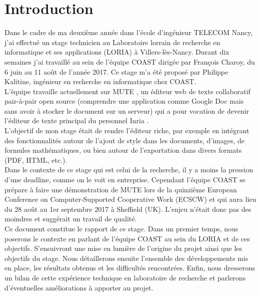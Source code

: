 \documentclass[12pt]{article}
\begin{document}
\section*{Introduction}
Dans le cadre de ma deuxième année dans l'école d'ingénieur TELECOM Nancy, j'ai effectué un stage technicien au Laboratoire lorrain de recherche en informatique et ses applications (LORIA) \cite{loria} à Villers-lès-Nancy. Durant dix semaines j'ai travaillé au sein de l'équipe COAST \cite{coast} dirigée par François Charoy, du 6 juin au 11 août de l'année 2017. Ce stage m'a été proposé par Philippe Kalitine, ingénieur en recherche en informatique chez COAST.\\

L'équipe travaille actuellement sur MUTE \cite{mute}, un éditeur web de texte collaboratif pair-à-pair open source (comprendre une application comme Google Doc mais sans avoir à stocker le document sur un serveur) qui a pour vocation de devenir l'éditeur de texte principal du personnel Inria \cite{inria}.\\

L'objectif de mon stage était de rendre l'éditeur riche, par exemple en intégrant des fonctionnalités autour de l'ajout de style dans les documents, d'images, de formules mathématiques, ou bien autour de l'exportation dans divers formats (PDF, HTML, etc.).\\

Dans le contexte de ce stage qui est celui de la recherche, il y a moins la pression d'une deadline, comme on le voit en entreprise. Cependant l'équipe COAST se prépare à faire une démonstration de MUTE lors de la quinzième European Conference on Computer-Supported Cooperative Work (ECSCW) \cite{ecscw} et qui aura lieu du 28 août au 1er septembre 2017 à Sheffield (UK). L'enjeu n'était donc pas des moindres et suggérait un travail de qualité.\\

Ce document constitue le rapport de ce stage. Dans un premier temps, nous poserons le contexte en parlant de l'équipe COAST au sein du LORIA et de ces objectifs. S'ensuivront une mise en lumière de l'origine du projet ainsi que les objectifs du stage. Nous détaillerons ensuite l'ensemble des développements mis en place, les résultats obtenus et les difficultés rencontrées. Enfin, nous dresserons un bilan de cette expérience technique en laboratoire de recherche et parlerons d'éventuelles améliorations à apporter au projet.\\
\end{document}
